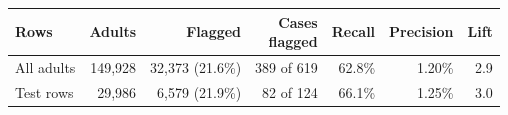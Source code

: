 \begin{tabular}{lrrrrrr}
\toprule
Rows & Adults & Flagged & \makecell[b]{Cases\\{}flagged} & Recall & Precision & Lift \\
\midrule
All adults & 149,928 & 32,373 (21.6\%) & 389 of 619 & 62.8\% & 1.20\% & 2.9 \\
Test rows & 29,986 & 6,579 (21.9\%) & 82 of 124 & 66.1\% & 1.25\% & 3.0 \\
\bottomrule
\end{tabular}
